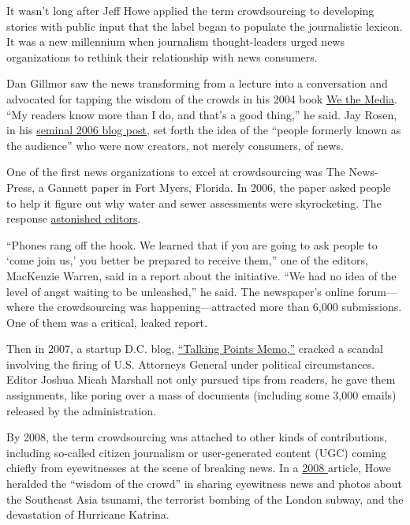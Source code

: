 \begin{itemize}
It wasn’t long after Jeff Howe applied the term crowdsourcing to developing stories with public input that the label began to populate the journalistic lexicon.\autocite{Howe} It was a new millennium when journalism thought-leaders urged news organizations to rethink their relationship with news consumers. 

Dan Gillmor saw the news transforming from a lecture into a conversation and advocated for tapping the wisdom of the crowds in his 2004 book \href{http://www.oreilly.com/wethemedia/}{We the Media}.\autocite{Gillmor} ``My readers know more than I do, and that’s a good thing,'' he said. Jay Rosen, in his \href{http://archive.pressthink.org/2006/06/27/ppl_frmr.html}{seminal 2006 blog post}, set forth the idea of the ``people formerly known as the audience'' who were now creators, not merely consumers, of news.\autocite{Rosen} 

One of the first news organizations to excel at crowdsourcing was The News-Press, a Gannett paper in Fort Myers, Florida. In 2006, the paper asked people to help it figure out why water and sewer assessments were skyrocketing. The response \href{http://www.crowdsourcing.com/cs/2006/11/the_new_investi.html}{astonished editors}. \autocite{FortMyers}

“Phones rang off the hook. We learned that if you are going to ask people to ‘come join us,’ you better be prepared to receive them,” one of the editors, MacKenzie Warren, said in a report about the initiative. \autocite{FortMyers} “We had no idea of the level of angst waiting to be unleashed,” he said. The newspaper’s online forum---where the crowdsourcing was happening---attracted more than 6,000 submissions. One of them was a critical, leaked report. 

Then in 2007, a startup D.C. blog, \href{http://www.nytimes.com/2008/02/25/business/media/25marshall.html?_r=3&oref=slogin&ref=todayspaper&pagewanted=print&}{``Talking Points Memo,''} cracked a scandal involving the firing of U.S. Attorneys General under political circumstances. Editor Joshua Micah Marshall not only pursued tips from readers, he gave them assignments, like poring over a mass of documents (including some 3,000 emails) released by the administration.\autocite{talkingpoints} 

By 2008, the term crowdsourcing was attached to other kinds of contributions, including so-called citizen journalism or user-generated content (UGC) coming chiefly from eyewitnesses at the scene of breaking news. In a \href{http://niemanreports.org/articles/the-wisdom-of-the-crowd-resides-in-how-the-crowd-is-used/}{2008 } article, Howe heralded the ``wisdom of the crowd'' in sharing eyewitness news and photos about the Southeast Asia tsunami, the terrorist bombing of the London subway, and the devastation of Hurricane Katrina.\autocite{Nieman}


\end{itemize}
